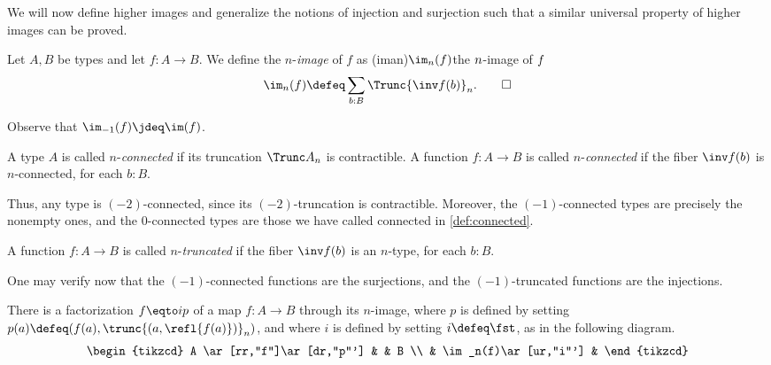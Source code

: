 We will now define higher images and generalize the notions
of injection and surjection such that a similar
universal property of higher images can be proved.

\begin{definition}\label{def:n-image}
  Let $A,B$ be types and let $f : A \to B$. We define the $n$-\emph{image} of $f$ as
  \glossary(iman){$\protect\im_n(f)$}{the $\protect n$-image of $\protect f$}
  \[
    \im_n(f) \defeq \sum_{b:B}\Trunc{\inv f (b)}_n.\qedhere
  \]
\end{definition}

Observe that $\im_{-1}(f) \jdeq \im(f)$.

\begin{definition}\label{def:n-connected}
  A type $A$ is called $n$-\emph{connected}
  if its truncation $\Trunc A _ n$ is contractible.
  A function $f : A \to B$ is called $n$-\emph{connected}
  if the fiber $\inv f (b)$ is $n$-connected, for each $b:B$.
\end{definition}

Thus, any type is $(-2)$-connected, since its $(-2)$-truncation is contractible.
Moreover, the $(-1)$-connected types are precisely the nonempty ones,
and the $0$-connected types are those we have called connected in \cref{def:connected}.

\begin{definition}\label{def:n-truncated}
  A function $f : A \to B$ is called $n$-\emph{truncated}
  if the fiber $\inv f (b)$ is an $n$-type, for each $b:B$.
\end{definition}

One may verify now that the $(-1)$-connected functions are the surjections, and
the $(-1)$-truncated functions are the injections.

There is a factorization $f \eqto ip$ of a map $f : A \to B$ 
through its $n$-image,
where $p$ is defined by setting $p(a)\defeq (f(a),\trunc{(a,\refl{f(a)})}_n)$,
and where $i$ is defined by setting $i\defeq\fst$, as in the following diagram.
\begin{equation}\label{eqn:n-image-factorization}
    \begin{tikzcd}
      A \ar[rr,"f"]\ar[dr,"p"'] & & B \\
      & \im_n(f)\ar[ur,"i"'] &
    \end{tikzcd}
\end{equation}

